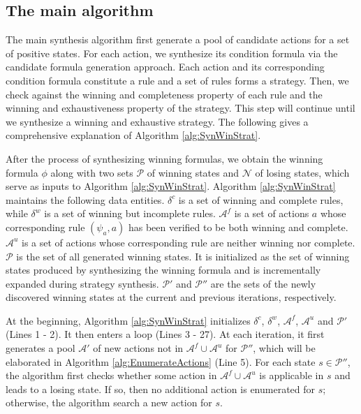 \documentclass[review]{elsarticle}
\newcommand{\positiveSet}{\mathcal{P}}
\newcommand{\negativeSet}{\mathcal{N}}
\newcommand{\act}{\mathcal{A}}
\begin{document}
\subsection{The main algorithm}
The main synthesis algorithm first generate a pool of candidate actions for a set of positive states.
For each action, we synthesize its condition formula via the candidate formula generation approach.
Each action and its corresponding condition formula constitute a rule and a set of rules forms a strategy.
Then, we check against the winning and completeness property of each rule and the winning and exhaustiveness property of the strategy.
This step will continue until we synthesize a winning and exhaustive strategy. %
The following gives a comprehensive explanation of Algorithm \ref{alg:SynWinStrat}.

After the process of synthesizing winning formulas, we obtain the winning formula $\phi$ along with two sets $\positiveSet$ of winning states and $\negativeSet$ of losing states, which serve as inputs to Algorithm \ref{alg:SynWinStrat}.
Algorithm \ref{alg:SynWinStrat} maintains the following data entities.
$\delta^c$ is a set of winning and complete rules, while $\delta^w$ is a set of winning but incomplete rules.
$\act^f$ is a set of actions $a$ whose corresponding rule $(\psi_a, a)$ has been verified to be both winning and complete. %
$\act^u$ is a set of actions whose corresponding rule are neither winning nor complete. 
$\positiveSet$ is the set of all generated winning states.
It is initialized as the set of winning states produced by synthesizing the winning formula and is incrementally expanded during strategy synthesis.
$\positiveSet'$ and $\positiveSet''$ are the sets of the newly discovered winning states at the current and previous iterations, respectively.

At the beginning, Algorithm \ref{alg:SynWinStrat} initializes $\delta^c$, $\delta^w$, $\act^f$, $\act^u$ and $\positiveSet'$ (Lines 1 - 2).
It then enters a loop (Lines 3 - 27).
At each iteration, it first generates a pool $\act'$ of new actions not in $\act^f \cup \act^u$ for $\positiveSet''$, which will be elaborated in Algorithm \ref{alg:EnumerateActions}  (Line 5).
For each state $s \in \positiveSet''$, the algorithm first checks whether some action in $\act^f \cup \act^u$ is applicable in $s$ and leads to a losing state.
If so, then no additional action is enumerated for $s$; otherwise, the algorithm search a new action for $s$.
\end{document}
